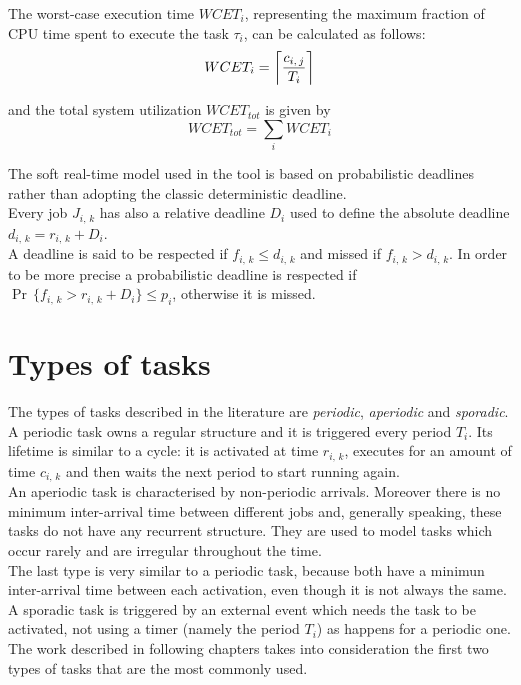 The worst-case execution time \( WCET_{i} \), representing the maximum fraction of CPU time spent to execute the task \( \tau_{i} \), can be calculated as follows:
\begin{equation*}
  WCET_{i} = \ceil[\bigg]{\frac{c_{i,\,j}}{T_{i}}}
\end{equation*}

and the total system utilization \( WCET_{tot} \) is given by
\begin{equation*}
  WCET_{tot} = \displaystyle\sum_{i} WCET_{i}
\end{equation*}

The soft real-time model used in the tool is based on probabilistic deadlines rather than adopting the classic deterministic deadline.\\
Every job \( J_{i,\,k} \) has also a relative deadline \( D_{i} \) used to define the absolute deadline \( d_{i,\,k} = r_{i,\,k} + D_{i} \). \\
A deadline is said to be respected if \( f_{i,\,k} \leq d_{i,\,k} \) and missed if \( f_{i,\,k} > d_{i,\,k} \). In order to be more precise a probabilistic deadline is respected if \( \Pr\,\{f_{i,\,k} > r_{i,\,k} + D_{i} \} \leq p_{i} \), otherwise it is missed.

\section{Types of tasks}
The types of tasks described in the literature are \emph{periodic}, \emph{aperiodic} and \emph{sporadic}.\\
A periodic task owns a regular structure and it is triggered every period \( T_{i} \). Its lifetime is similar to a cycle: it is activated at time \( r_{i,\,k} \), executes for an amount of time \( c_{i,\,k} \) and then waits the next period to start running again.\\
An aperiodic task is characterised by non-periodic arrivals. Moreover there is no minimum inter-arrival time between different jobs and, generally speaking, these tasks do not have any recurrent structure. They are used to model tasks which occur rarely and are irregular throughout the time.\\
The last type is very similar to a periodic task, because both have a minimun inter-arrival time between each activation, even though it is not always the same. A sporadic task is triggered by an external event which needs the task to be activated, not using a timer (namely the period \( T_{i} \)) as happens for a periodic one.\\
The work described in following chapters takes into consideration the first two types of tasks that are the most commonly used.

